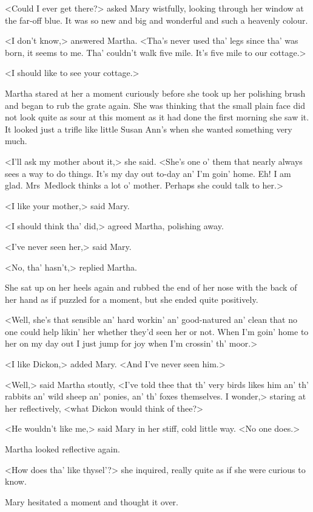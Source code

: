<Could I ever get there?> asked Mary wistfully, looking through her window at the far-off blue. It was so new and big and wonderful and such a heavenly colour.

<I don't know,> answered Martha. <Tha's never used tha' legs since tha' was born, it seems to me. Tha' couldn't walk five mile. It's five mile to our cottage.>

<I should like to see your cottage.>

Martha stared at her a moment curiously before she took up her polishing brush and began to rub the grate again. She was thinking that the small plain face did not look quite as sour at this moment as it had done the first morning she saw it. It looked just a trifle like little Susan Ann's when she wanted something very much.

<I'll ask my mother about it,> she said. <She's one o' them that nearly always sees a way to do things. It's my day out to-day an' I'm goin' home. Eh! I am glad. Mrs~Medlock thinks a lot o' mother. Perhaps she could talk to her.>

<I like your mother,> said Mary.

<I should think tha' did,> agreed Martha, polishing away.

<I've never seen her,> said Mary.

<No, tha' hasn't,> replied Martha.

She sat up on her heels again and rubbed the end of her nose with the back of her hand as if puzzled for a moment, but she ended quite positively.

<Well, she's that sensible an' hard workin' an' good-natured an' clean that no one could help likin' her whether they'd seen her or not. When I'm goin' home to her on my day out I just jump for joy when I'm crossin' th' moor.>

<I like Dickon,> added Mary. <And I've never seen him.>

<Well,> said Martha stoutly, <I've told thee that th' very birds likes him an' th' rabbits an' wild sheep an' ponies, an' th' foxes themselves. I wonder,> staring at her reflectively, <what Dickon would think of thee?>

<He wouldn't like me,> said Mary in her stiff, cold little way. <No one does.>

Martha looked reflective again.

<How does tha' like thysel'?> she inquired, really quite as if she were curious to know.

Mary hesitated a moment and thought it over.

